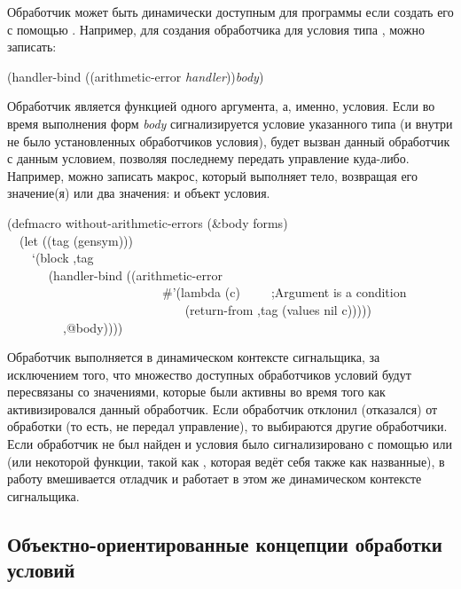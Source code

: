 Обработчик может быть динамически доступным для программы если создать его с
помощью . Например, для создания обработчика для условия типа
, можно записать:
\begingroup
\makeatletter
\def\@listi{\leftmargin\leftmargini \labelsep\leftmargin
   \parsep 3pt\relax
   \topsep 4pt plus 9pt\relax
   \itemsep\topsep}
\makeatother
\begin{lisp}
(handler-bind ((arithmetic-error \emph{handler}))\emph{body})
\end{lisp}
Обработчик является функцией одного аргумента, а, именно, условия. Если во время
выполнения форм \emph{body} сигнализируется условие указанного типа (и внутри не
было установленных обработчиков условия), будет вызван данный обработчик с данным
условием, позволяя последнему передать управление куда-либо. Например, можно
записать макрос, который выполняет тело, возвращая его значение(я) или два
значения:  и объект условия.
\begin{lisp}
(defmacro without-arithmetic-errors (\&body forms) \\
~~(let ((tag (gensym))) \\
~~~~`(block ,tag \\
~~~~~~ (handler-bind ((arithmetic-error \\
~~~~~~~~~~~~~~~~~~~~~~~~~\#'(lambda (c)~~~~~;\textrm{Argument  is a condition} \\
~~~~~~~~~~~~~~~~~~~~~~~~~~~~ (return-from ,tag (values nil c))))) \\
~~~~~~~~~,@body)))) \\
\end{lisp}
\endgroup
Обработчик выполняется в динамическом контексте сигнальщика, за исключением
того, что множество доступных обработчиков условий будут пересвязаны со
значениями, которые были активны во время того как активизировался данный
обработчик. Если обработчик отклонил (отказался) от обработки (то есть, не
передал управление), то выбираются другие обработчики. Если обработчик не был
найден и условия было сигнализировано с помощью  или 
(или некоторой функции, такой как , которая ведёт себя также как
названные), в работу вмешивается отладчик и работает в этом же динамическом
контексте сигнальщика.

\subsection{Объектно-ориентированные концепции обработки условий}
\label{OBJECT-0RIENTED-BASIS}

